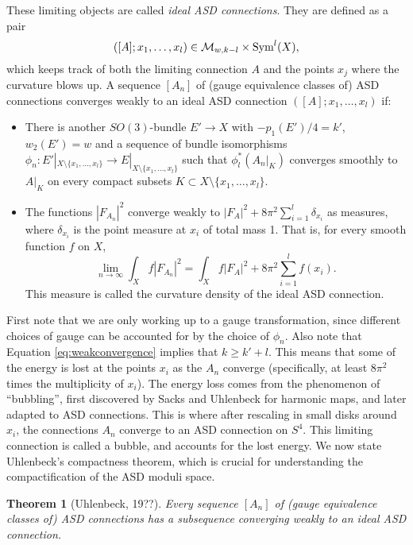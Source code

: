 \documentclass[a4paper]{article}
\newcommand{\M}{\mathcal{M}}
\newcommand{\ra}{\rightarrow}
\newcommand{\Sym}{\textnormal{Sym}}
\newtheorem{theorem}{Theorem}
\theoremstyle{definition}
\numberwithin{theorem}{subsection}
\begin{document}
These limiting objects are called \emph{ideal ASD connections}. They are defined as a pair
$$([A];x_1,\dots,x_l)\in \M_{w,k-l}\times \Sym^l(X),$$
which keeps track of both the limiting connection $A$ and the points $x_j$ where the curvature blows up. A sequence $[A_n]$ of (gauge equivalence classes of) ASD connections converges weakly to an ideal ASD connection $([A];x_1,\dots,x_l)$ if:
\begin{itemize}
    \item There is another $SO(3)$-bundle $E'\ra X$ with $-p_1(E')/4=k'$, $w_2(E')=w$ and a sequence of bundle isomorphisms $\phi_n:E'|_{X\setminus \{x_1,\dots,x_l\}}\ra E|_{X\setminus \{x_1,\dots,x_l\}}$ such that $\phi_l^*(A_n|_{K})$ converges smoothly to $A|_K$ on every compact subsets $K\subset X\setminus\{x_1,\dots,x_l\}$.
    \item The functions $|F_{A_n}|^2$ converge weakly to $|F_{A}|^2 + 8\pi^2\sum_{i=1}^l \delta_{x_i}$ as measures, where $\delta_{x_i}$ is the point measure at $x_i$ of total mass 1. That is, for every smooth function $f$ on $X$, 
    \begin{equation}\label{eq:weakconvergence}
        \lim_{n\ra\infty} \int_X f|F_{A_n}|^2 = \int_X f|F_{A}|^2 + 8\pi^2\sum_{i=1}^l f(x_i).
    \end{equation}
    This measure is called the curvature density of the ideal ASD connection.
\end{itemize}

First note that we are only working up to a gauge transformation, since different choices of gauge can be accounted for by the choice of $\phi_n$. Also note that Equation \ref{eq:weakconvergence} implies that $k\geq k' + l$. This means that some of the energy is lost at the points $x_i$ as the $A_n$ converge (specifically, at least $8\pi^2$ times the multiplicity of $x_i$). The energy loss comes from the phenomenon of ``bubbling'', first discovered by Sacks and Uhlenbeck for harmonic maps, and later adapted to ASD connections. This is where after rescaling in small disks around $x_i$, the connections $A_n$ converge to an ASD connection on $S^4$. This limiting connection is called a bubble, and accounts for the lost energy. We now state Uhlenbeck's compactness theorem, which is crucial for understanding the compactification of the ASD moduli space. 

\begin{theorem}[Uhlenbeck, 19??]
    Every sequence $[A_n]$ of (gauge equivalence classes of) ASD connections has a subsequence converging weakly to an ideal ASD connection.  
\end{theorem}
\end{document}
